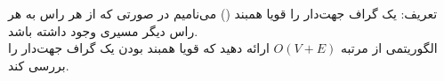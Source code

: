 تعریف: یک گراف جهت‌دار را قویا همبند () می‌نامیم در صورتی که از هر راس به هر راس دیگر مسیری وجود داشته باشد.
\\
الگوریتمی از مرتبه $O(V+E)$ ارائه دهید که قویا همبند بودن یک گراف جهت‌دار را بررسی کند.